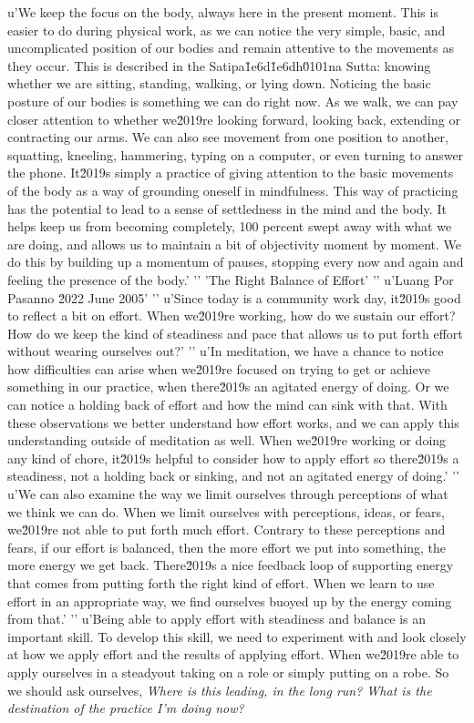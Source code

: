 u'We keep the focus on the body, always here in the present moment. This is easier to do during physical work, as we can notice the very simple, basic, and uncomplicated position of our bodies and remain attentive to the movements as they occur. This is described in the Satipa\u1e6d\u1e6dh\u0101na Sutta: knowing whether we are sitting, standing, walking, or lying down. Noticing the basic posture of our bodies is something we can do right now. As we walk, we can pay closer attention to whether we\u2019re looking forward, looking back, extending or contracting our arms. We can also see movement from one position to another, squatting, kneeling, hammering, typing on a computer, or even turning to answer the phone. It\u2019s simply a practice of giving attention to the basic movements of the body as a way of grounding oneself in mindfulness. This way of practicing has the potential to lead to a sense of settledness in the mind and the body. It helps keep us from becoming completely, 100 percent swept away with what we are doing, and allows us to maintain a bit of objectivity moment by moment. We do this by building up a momentum of pauses, stopping every now and again and feeling the presence of the body.'
'\n'
'The Right Balance of Effort'
'\n'
u'Luang Por Pasanno \u2022 June 2005'
'\n'
u'Since today is a community work day, it\u2019s good to reflect a bit on effort. When we\u2019re working, how do we sustain our effort? How do we keep the kind of steadiness and pace that allows us to put forth effort without wearing ourselves out?'
'\n'
u'In meditation, we have a chance to notice how difficulties can arise when we\u2019re focused on trying to get or achieve something in our practice, when there\u2019s an agitated energy of doing. Or we can notice a holding back of effort and how the mind can sink with that. With these observations we better understand how effort works, and we can apply this understanding outside of meditation as well. When we\u2019re working or doing any kind of chore, it\u2019s helpful to consider how to apply effort so there\u2019s a steadiness, not a holding back or sinking, and not an agitated energy of doing.'
'\n'
u'We can also examine the way we limit ourselves through perceptions of what we think we can do. When we limit ourselves with perceptions, ideas, or fears, we\u2019re not able to put forth much effort. Contrary to these perceptions and fears, if our effort is balanced, then the more effort we put into something, the more energy we get back. There\u2019s a nice feedback loop of supporting energy that comes from putting forth the right kind of effort. When we learn to use effort in an appropriate way, we find ourselves buoyed up by the energy coming from that.'
'\n'
u'Being able to apply effort with steadiness and balance is an important skill. To develop this skill, we need to experiment with and look closely at how we apply effort and the results of applying effort. When we\u2019re able to apply ourselves in a steadyout taking on a 
role or simply putting on a robe. So we should ask ourselves, 
\emph{Where is this leading, in the long run? What is the destination 
of the practice I'm doing now?}

